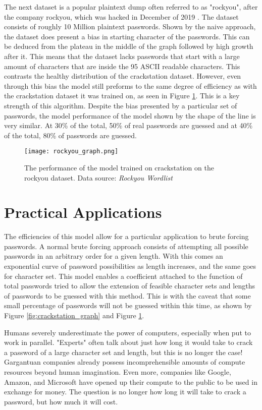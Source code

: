 \documentclass[11pt]{article}
\begin{document}
The next dataset is a popular plaintext dump often referred to as "rockyou", after the company rockyou, which was hacked in December of 2019 \cite{techcrunch_rockyou}. The dataset consists of roughly 10 Million plaintext passwords. Shown by the naive approach, the dataset does present a bias in starting character of the passwords. This can be deduced from the plateau in the middle of the graph followed by high growth after it. This means that the dataset lacks passwords that start with a large amount of characters that are inside the 95 ASCII readable characters. This contrasts the healthy distribution of the crackstation dataset. However, even through this bias the model still preforms to the same degree of efficiency as with the crackstation dataset it was trained on, as seen in Figure \ref{fig:rockyou_graph}. This is a key strength of this algorithm. Despite the bias presented by a particular set of passwords, the model performance of the model shown by the shape of the line is very similar. At 30\% of the total, 50\% of real passwords are guessed and at 40\% of the total, 80\% of passwords are guessed.

\begin{figure}[H]
\centering
    \texttt{[image: rockyou\_graph.png]}
\caption{The performance of the model trained on crackstation on the rockyou dataset. Data source: \textit{Rockyou Wordlist} \cite{rockyou_passwords}}

\label{fig:rockyou_graph}
\end{figure}

\section{Practical Applications} \label{practical_applications_sec}
The efficiencies of this model allow for a particular application to brute forcing passwords. A normal brute forcing approach consists of attempting all possible passwords in an arbitrary order for a given length. With this comes an exponential curve of password possibilities as length increases, and the same goes for character set. This model enables a coefficient attached to the function of total passwords tried to allow the extension of feasible character sets and lengths of passwords to be guessed with this method. This is with the caveat that some small percentage of passwords will not be guessed within this time, as shown by Figure \ref{fig:crackstation_graph} and Figure \ref{fig:rockyou_graph}.

Humans severely underestimate the power of computers, especially when put to work in parallel. "Experts" often talk about just how long it would take to crack a password of a large character set and length, but this is no longer the case! Gargantuan companies already possess incomprehensible amounts of compute resources beyond human imagination. Even more, companies like Google, Amazon, and Microsoft have opened up their compute to the public to be used in exchange for money. The question is no longer how long it will take to crack a password, but how much it will cost.
\end{document}
